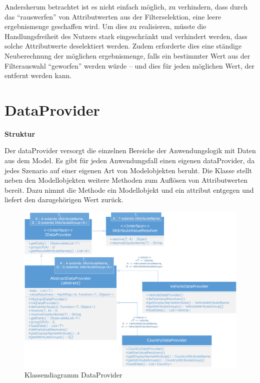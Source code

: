 Andersherum betrachtet ist es nicht einfach möglich, zu verhindern, dass durch das \enquote{rauswerfen} von Attributwerten aus der Filterselektion, eine leere \gls{ergebnismenge} geschaffen wird. Um dies zu realisieren, müsste die Handlungsfreiheit des Nutzers stark eingeschränkt und verhindert werden, dass solche Attributwerte deselektiert werden. Zudem erforderte dies eine ständige Neuberechnung der möglichen \gls{ergebnismenge}, falls ein bestimmter Wert aus der Filterauswahl \enquote{geworfen} werden würde – und dies für jeden möglichen Wert, der entfernt werden kann.

\section{DataProvider} \label{sec:implDataProvider}
\textbf{Struktur}

Der \gls{dataProvider} versorgt die einzelnen Bereiche der Anwendungslogik mit Daten aus dem Model. Es gibt für jeden Anwendungsfall einen eigenen \gls{dataProvider}, da jedes Szenario auf einer eigenen Art von Modelobjekten beruht. Die Klasse stellt neben den Modellobjekten weitere Methoden zum Auflösen von Attributwerten bereit. Dazu nimmt die Methode ein Modellobjekt und ein \gls{attribut} entgegen und liefert den dazugehörigen Wert zurück.

\begin{figure}[H]
 \centering
 \includegraphics[width=1\textwidth]{grafiken/Class_DataProvider.png}
 \caption{Klassendiagramm DataProvider}
 \label{fig:dataProvider1}
\end{figure}

